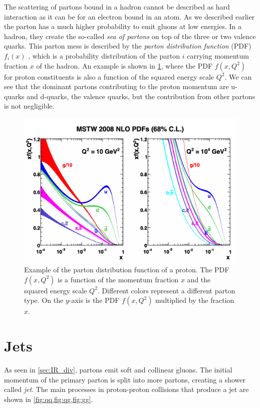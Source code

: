 The scattering of partons bound in a hadron cannot be described as hard interaction as it can be for an electron bound in an atom.
As we described earlier the parton has a much higher probability to emit gluons at low energies.
In a hadron, they create the so-called \emph{sea of partons} on top of the three or two valence quarks.
This parton mess is described by the \emph{parton distribution function} (PDF) $f_i(x)$ \cite{pdf_feynman}, which is a probability distribution of the parton $i$ carrying momentum fraction $x$ of the hadron.
An example is shown in \cref{fig:pdf}, where the PDF $f(x, Q^2)$ for proton constituents is also a function of the squared energy scale $Q^2$.
We can see that the dominant partons contributing to the proton momentum are u-quarks and d-quarks, the valence quarks, but the contribution from other partons is not negligible. 
\begin{figure}[htb]
    \centering
    \includegraphics[width=0.7\linewidth]{src/img/pdf.png}
    \caption[Example of the parton distribution functions for a proton. The PDF $f(x, Q^2)$ is a function of the momentum fraction $x$ and the squared energy scale $Q^2$. Different colors represent a different parton type. On the $y$-axis is the PDF $f(x,Q^2)$ multiplied by the fraction $x$.]{Example of the parton distribution function of a proton. The PDF $f(x, Q^2)$ is a function of the momentum fraction $x$ and the squared energy scale $Q^2$. Different colors represent a different parton type. On the $y$-axis is the PDF $f(x,Q^2)$ multiplied by the fraction $x$. \footnotemark}
    \label{fig:pdf}
\end{figure}

\section{Jets}
\label{sec:jet}
As seen in \cref{sec:IR_div}, partons emit soft and collinear gluons.
The initial momentum of the primary parton is split into more partons, creating a shower called \emph{jet}.
The main processes in proton-proton collisions that produce a jet are shown in \cref{fig:qq,fig:qg,fig:gg}.

